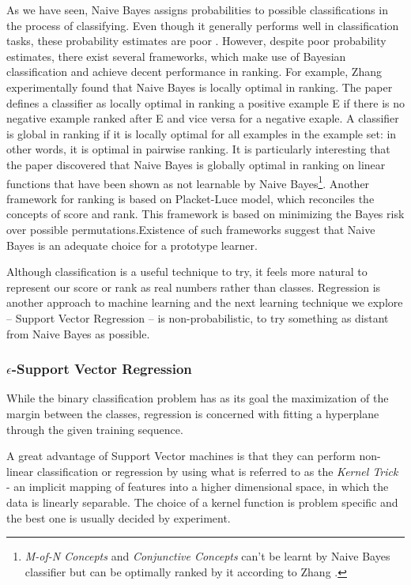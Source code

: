 \documentclass[12pt,notitlepage,twoside]{scrreprt}
\begin{document}
As we have seen, Naive Bayes assigns probabilities to possible classifications
in the process of classifying. Even though it generally performs well in
classification tasks, these probability estimates are poor \cite{domingos96}.
However, despite poor probability estimates, there exist several frameworks,
which make use of Bayesian classification and achieve decent performance in
ranking. For example, Zhang \cite{zhang04} experimentally found that Naive
Bayes is locally optimal in ranking. The paper defines a classifier as locally
optimal in ranking a positive example E if there is no negative example ranked
after E and vice versa for a negative exaple. A classifier is global in ranking
if it is locally optimal for all examples in the example set: in other words,
it is optimal in pairwise ranking.  It is particularly interesting that the
paper discovered that Naive Bayes is globally optimal in ranking on linear
functions that have been shown as not learnable by Naive
Bayes\footnote{\textit{M-of-N
  Concepts} and \textit{Conjunctive Concepts} can't be learnt by Naive Bayes classifier but
can be optimally ranked by it according to Zhang \cite{zhang04}.}.
Another framework for ranking \cite{bayesrank} is based on Placket-Luce model, which reconciles
the concepts of score and rank. This framework is based on minimizing the Bayes
risk over possible permutations.Existence of such frameworks suggest that Naive Bayes is an adequate choice
for a prototype learner.

Although classification is a useful technique to try, it feels more natural to
represent our score or rank as real numbers rather than classes. Regression is
another approach to machine learning and the next learning technique we explore
-- Support Vector Regression -- is non-probabilistic, to try something as distant
from Naive Bayes as possible.

\subsubsection*{\(\epsilon\)-Support Vector Regression}
While the binary classification problem has as its goal the maximization of the
margin between the classes, regression is concerned with fitting a hyperplane
through the given training sequence. 

A great advantage of Support Vector machines is that they can perform
non-linear classification or regression by using what is referred to as the
\textit{Kernel Trick} - an implicit mapping of features into a higher
dimensional space, in which the data is linearly separable. The choice of a
kernel function is problem specific and the best one is usually decided by
experiment. 
\end{document}
